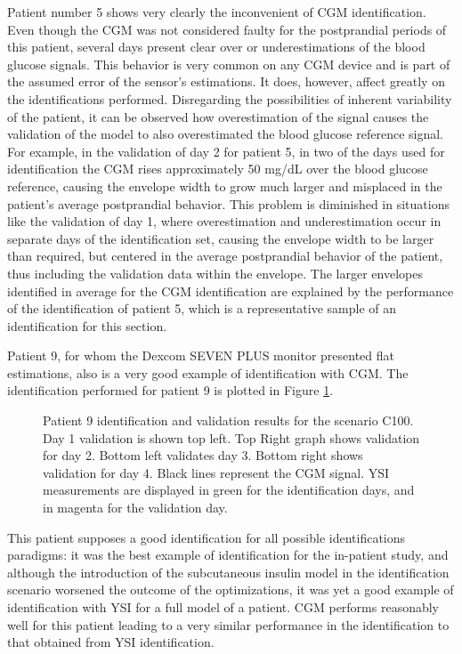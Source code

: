 Patient number 5 shows very clearly the inconvenient of CGM identification. Even though the CGM was not considered faulty for the postprandial periods of this patient, several days present clear over or underestimations of the blood glucose signals. This behavior is very common on any CGM device and is part of the assumed error of the sensor's estimations. It does, however, affect greatly on the identifications performed. Disregarding the possibilities of inherent variability of the patient, it can be observed how overestimation of the signal causes the validation of the model to also overestimated the blood glucose reference signal. For example, in the validation of day 2 for patient 5, in two of the days used for identification the CGM rises approximately 50 mg/dL over the blood glucose reference, causing the envelope width to grow much larger and misplaced in the patient's average postprandial behavior. This problem is diminished in situations like the validation of day 1, where overestimation and underestimation occur in separate days of the identification set, causing the envelope width to be larger than required, but centered in the average postprandial behavior of the patient, thus including the validation data within the envelope. The larger envelopes identified in average for the CGM identification are explained by the performance of the identification of patient 5, which is a representative sample of an identification for this section.

Patient 9, for whom the Dexcom\textsuperscript{\textregistered} SEVEN\textsuperscript{\textregistered} PLUS monitor presented flat estimations, also is a very good example of identification with CGM. The identification performed for patient 9 is plotted in Figure \ref{fig:CGMpatient9}.

\begin{figure}[hbt]
\centering
{}\caption{Patient 9 identification and validation results for the scenario C100. Day 1 validation is shown top left. Top Right graph shows validation for day 2. Bottom left validates day 3. Bottom right shows validation for day 4. Black lines represent the CGM signal. YSI measurements are displayed in green for the identification days, and in magenta for the validation day.}
\label{fig:CGMpatient9}
\end{figure}

This patient supposes a good identification for all possible identifications paradigms: it was the best example of identification for the in-patient study, and although the introduction of the subcutaneous insulin model in the identification scenario worsened the outcome of the optimizations, it was yet a good example of identification with YSI for a full model of a patient. CGM performs reasonably well for this patient leading to a very similar performance in the identification to that obtained from YSI identification.

